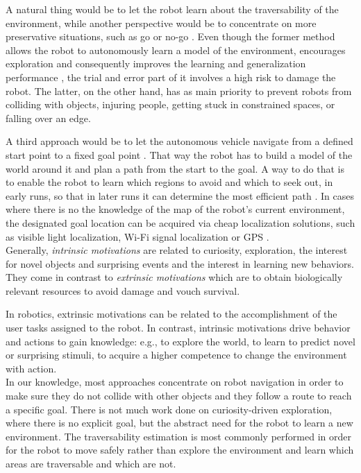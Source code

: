 \documentclass[12pt,a4paper]{report}
\newcommand{\term}{\textit}
\newcommand{\acronym}{\MakeUppercase}
\begin{document}
	A natural thing would be to let the robot learn about the traversability 
	of the environment, while another perspective would be to concentrate on more 
	preservative situations, such as go or no-go \citep{Hirose}. Even though the 
	former method allows the robot to autonomously learn a model of the environment,
	encourages exploration and consequently improves the learning and generalization 
	performance \citep{Zhelo}, the trial and error part of it involves a high risk to 
	damage the robot. The latter, on the other hand, has as main priority to prevent 
	robots from colliding with objects, injuring people, getting stuck in constrained 
	spaces, or falling over an edge. 
	\par
	A third approach would be to let the autonomous vehicle navigate from a defined 
	start point to a fixed goal	point \citep{Shneier, Zhelo}. That way the robot has 
	to build a model of the world around it and plan a path from the start to the 
	goal. A way to do that is to enable the robot to learn which regions to avoid 
	and which to seek out, in early runs, so that in later runs it can determine the 
	most efficient path \citep{Shneier}. In cases where there is no the knowledge of 
	the map of the robot's current environment, the designated goal location can be 
	acquired via cheap localization solutions, such as visible light localization, 
	Wi-Fi signal localization or \acronym{gps} \citep{Zhelo}.
	\\
	
	Generally, \term{intrinsic motivations} are related to curiosity, exploration, 
	the interest for novel objects and surprising events and the interest in 
	learning new behaviors. They come in contrast to \term{extrinsic motivations} 
	which are to obtain biologically relevant resources to avoid damage and vouch 
	survival.
	\par
	In robotics, extrinsic motivations can be related to the accomplishment of the 
	user tasks assigned to the robot. In contrast, intrinsic motivations drive 
	behavior and actions to gain knowledge: e.g., to explore the world, to learn to 
	predict novel or surprising stimuli, to acquire a higher competence to change 
	the environment with action.
	\\
	
	In our knowledge, most approaches concentrate on robot navigation in order to 
	make sure they do not collide with other objects and they follow a route to 
	reach a specific goal. There is not much work done on curiosity-driven 
	exploration, where there is no explicit goal, but the abstract need for the 
	robot to learn a new environment. The traversability estimation is most commonly 
	performed in order for the robot to move safely rather than explore the 
	environment and learn which areas are traversable and which are not.
	\\
		
\end{document}
